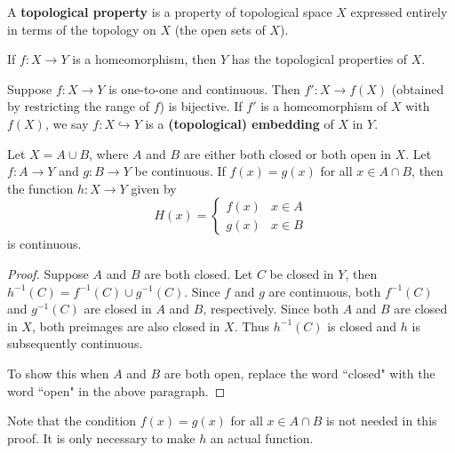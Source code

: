 \documentclass[10pt]{report}
\begin{document}
\begin{defn}
	A \textbf{topological property} is a property of topological space $X$ expressed entirely in terms of the topology on $X$ (the open sets of $X$).
\end{defn}

If $f:X \to Y$ is a homeomorphism, then $Y$ has the topological properties of $X$.

\begin{defn}
	Suppose $f: X \to  Y$ is one-to-one and continuous. Then $f':X \to  f(X)$ (obtained by restricting the range of $f$) is bijective. If $f'$ is a homeomorphism of $X$ with $f(X)$, we say $f: X \hookrightarrow  Y$ is a \textbf{(topological) embedding} of $X$ in $Y$.
\end{defn}

\begin{thrm}
	Let $X = A \cup B$, where $A$ and $B$ are either both closed or both open in $X$. Let $f:A \to Y$ and $g:B\to Y$ be continuous. If $f(x)=g(x)$ for all $x \in A \cap B$, then the function $h : X \to Y$ given by
	\[
		H(x)=
		\begin{cases}
			f(x) & x \in A \\
			g(x) & x\in B
		\end{cases}
	\] is continuous.
\end{thrm}
\begin{proof}
	Suppose $A$ and $B$ are both closed. Let $C$ be closed in $Y$, then $h^{-1}(C) = f^{-1}(C) \cup g^{-1}(C)$. Since $f$ and $g$ are continuous, both $f^{-1}(C)$ and $g^{-1}(C)$ are closed in $A$ and $B$, respectively. Since both $A$ and $B$ are closed in $X$, both preimages are also closed in $X$. Thus $h^{-1}(C)$ is closed and $h$ is subsequently continuous.

	To show this when $A$ and $B$ are both open, replace the word ``closed" with the word ``open" in the above paragraph.
\end{proof}

	Note that the condition $f(x) = g(x)$ for all $x \in A \cap B$ is not needed in this proof. It is only necessary to make $h$ an actual function.
\end{document}
